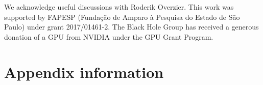 \documentclass[preprint2]{aastex62}
\begin{document}
\acknowledgments

We acknowledge useful discussions with Roderik Overzier. This work was supported by FAPESP (Funda\c{c}\~ao de Amparo \`a Pesquisa do Estado de S\~ao Paulo) under grant 2017/01461-2. The Black Hole Group has received a generous donation of a GPU from NVIDIA under the GPU Grant Program.

\vspace{5mm}



\appendix

\section{Appendix information}






\end{document}
